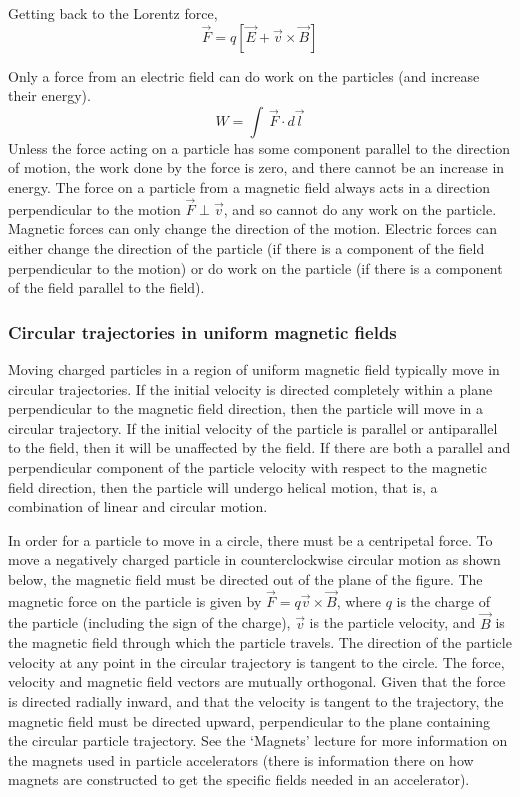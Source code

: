\documentclass[12pt]{article}
\begin{document}
\begin{flushleft}
{\color{grey} \hrulefill}

Getting back to the Lorentz force,
\[
\vec{F}=q[\vec{E} + \vec{v} \times \vec{B}]
\]

Only a force from an electric field can do work on the particles (and increase their energy). 
\[ 
W=\int \: \vec{F} \cdot d\vec{l}
\]
Unless the force acting on a particle has some component parallel to the direction of motion, the work done by the force is zero, and there cannot be an increase in energy.  The force on a particle from a magnetic field always acts in a direction perpendicular to the motion $\vec{F}\perp \vec{v}$, and so cannot do any work on the particle.  Magnetic forces can only change the direction of the motion.  Electric forces can either change the direction of the particle (if there is a component of the field perpendicular to the motion) or do work on the particle (if there is a component of the field parallel to the field).

\subsubsection*{\color{myblue} \bf Circular trajectories in uniform magnetic fields}

Moving charged particles in a region of uniform magnetic field typically move in circular trajectories.  If the initial velocity is directed completely within a plane perpendicular to the magnetic field direction, then the particle will move in a circular trajectory.  If the initial velocity of the particle is parallel or antiparallel to the field, then it will be unaffected by the field.  If there are both a parallel and perpendicular component of the particle velocity with respect to the magnetic field direction, then the particle will undergo helical motion, that is, a combination of linear and circular motion.

In order for a particle to move in a circle, there must be a centripetal force.  To move a negatively charged particle in counterclockwise circular motion as shown below, the magnetic field must be directed out of the plane of the figure.  The magnetic force on the particle is given by \mbox{$\vec{F}=q\vec{v}\times \vec{B}$}, where $q$ is the charge of the particle (including the sign of the charge), $\vec{v}$ is the particle velocity, and $\vec{B}$ is the magnetic field through which the particle travels.  The direction of the particle velocity at any point in the circular trajectory is tangent to the circle.  The force, velocity and magnetic field vectors are mutually orthogonal.  Given that the force is directed radially inward, and that the velocity is tangent to the trajectory, the magnetic field must be directed upward, perpendicular to the plane containing the circular particle trajectory.  See the `Magnets' lecture for more information on the magnets used in particle accelerators (there is information there on how magnets are constructed to get the specific fields needed in an accelerator).


\end{flushleft}
\end{document}
